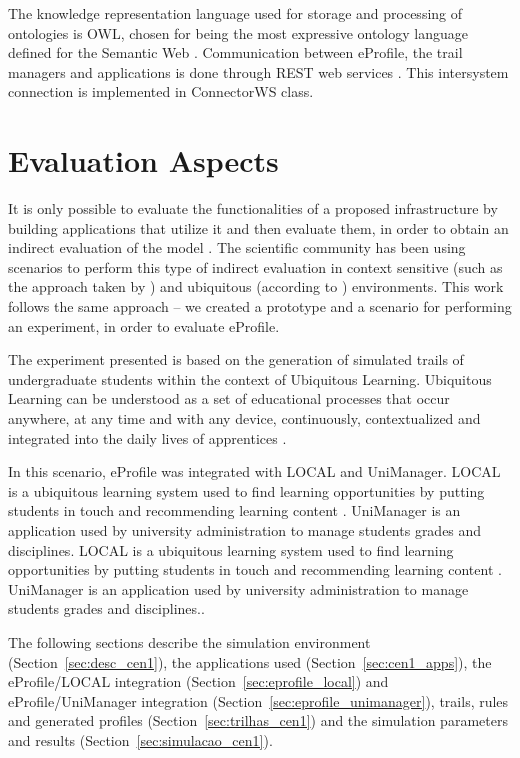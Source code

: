 \documentclass{svjour3}                     %
\begin{document}
The knowledge representation language used for storage and processing of ontologies is OWL\citep {owl-guide}, chosen for being the most expressive ontology language defined for the Semantic Web \citep{daconta03}. Communication between eProfile, the trail managers and applications is done through REST web services \citep{fielding00}. This intersystem connection is implemented in ConnectorWS class.

\section{Evaluation Aspects}
\label{ch:cenario}

It is only possible to evaluate the functionalities of a proposed infrastructure by building applications that utilize it and then evaluate them, in order to obtain an indirect evaluation of the model \citep{edwards03}. The scientific community has been using scenarios to perform this type of indirect evaluation in context sensitive (such as the approach taken by \citet{dey2001b}) and ubiquitous (according to \citet{satyanarayanan01}) environments. This work follows the same approach -- we created a prototype and a scenario for performing an experiment, in order to evaluate eProfile.

The experiment presented is based on the generation of simulated trails of undergraduate students within the context of Ubiquitous Learning. Ubiquitous Learning can be understood as a set of educational processes that occur anywhere, at any time and with any device, continuously, contextualized and integrated into the daily lives of apprentices \citep{barbosa11}.

In this scenario, eProfile was integrated with LOCAL and UniManager. LOCAL is a ubiquitous learning system used to find learning opportunities by putting students in touch and recommending learning content \citep{barbosa11}. UniManager is an application used by university administration to manage students grades and disciplines. LOCAL is a ubiquitous learning system used to find learning opportunities by putting students in touch and recommending learning content \citep{barbosa11}. UniManager is an application used by university administration to manage students grades and disciplines..

The following sections describe the simulation environment (Section~\ref{sec:desc_cen1}), the applications used (Section~\ref{sec:cen1_apps}), the eProfile/LOCAL integration (Section~\ref{sec:eprofile_local}) and eProfile/UniManager integration (Section~\ref{sec:eprofile_unimanager}), trails, rules and generated profiles (Section~\ref{sec:trilhas_cen1}) and the simulation parameters and results (Section~\ref{sec:simulacao_cen1}).
\end{document}
